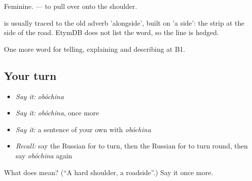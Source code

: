 Feminine. \emph{  } — to pull over onto the shoulder.

\begin{cousinweb}
\emph{} is usually traced to the old adverb \emph{} 'alongside', built on \emph{} 'a side': the strip at the side of the road. EtymDB does not list the word, so the line is hedged.
\end{cousinweb}

\begin{grammarlens}[title={What you've built}]
One more word for telling, explaining and describing at B1.
\end{grammarlens}

\subsection*{Your turn}
\begin{itemize}
\raggedright
  \item \emph{Say it:} \emph{obóchina}
  \item \emph{Say it:} \emph{obóchina}, once more
  \item \emph{Say it:} a sentence of your own with \emph{obóchina}
  \item \emph{Recall:} say the Russian for to turn, then the Russian for to turn round, then say \emph{obóchina} again
\end{itemize}

\begin{tcolorbox}[breakable,colback=teal!4,colframe=teal!35!black,title={Before you move on}]
What does  mean? (\textquotedblleft{}A hard shoulder, a roadside\textquotedblright{}.) Say it once more.
\end{tcolorbox}
